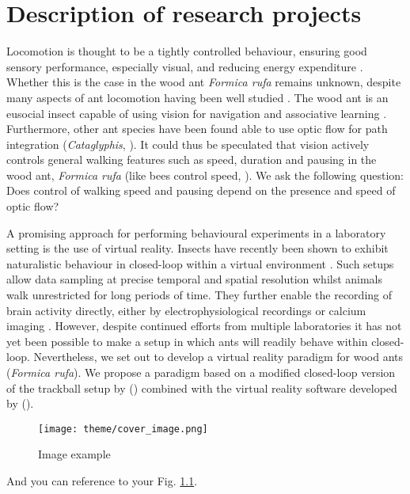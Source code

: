 \chapter{Description of research projects}
\label{chap:description-projects}

Locomotion is thought to be a tightly controlled behaviour, ensuring good sensory performance, especially visual, and reducing energy expenditure \autocites{Benichou2011IntermittentStrategies, Kramer2001}. Whether this is the case in the wood ant \textit{Formica rufa} remains unknown, despite many aspects of ant locomotion having been well studied \autocites{Lipp2005, Wahl2015}. The wood ant is an eusocial insect capable of using vision for navigation \autocite{Harris2007} and associative learning \autocite{Fernandes2017a}. Furthermore, other ant species have been found able to use optic flow for path integration (\textit{Cataglyphis}, \citealt{Ronacher1995, Pfeffer2016}). It could thus be speculated that vision actively controls general walking features such as speed, duration and pausing in the wood ant, \textit{Formica rufa} (like bees control speed, \cite{Schone1996, Linander2015}). We ask the following question: Does control of walking speed and pausing depend on the presence and speed of optic flow?

A promising approach for performing behavioural experiments in a laboratory setting is the use of virtual reality. Insects have recently been shown to exhibit naturalistic behaviour in closed-loop within a virtual environment \autocites{Takalo2012, Buatois2017, Seelig2010}. Such setups allow data sampling at precise temporal and spatial resolution whilst animals walk unrestricted for long periods of time. They further enable the recording of brain activity directly, either by electrophysiological recordings or calcium imaging \autocite{Seelig2010}. However, despite continued efforts from multiple laboratories it has not yet been possible to make a setup in which ants will readily behave within closed-loop. Nevertheless, we set out to develop a virtual reality paradigm for wood ants (\textit{Formica rufa}). We propose a paradigm based on a modified closed-loop version of the trackball setup by \citeauthor{Dahmen2017} (\citeyear{Dahmen2017}) combined with the virtual reality software developed by \citeauthor{Aronov2014b} (\citeyear{Aronov2014b}).

\begin{figure}[h]
    \centering
    \texttt{[image: theme/cover\_image.png]}
    \caption{Image example}
    \label{fig:image_example}
\end{figure}

And you can reference to your Fig. \ref{fig:image_example}.
